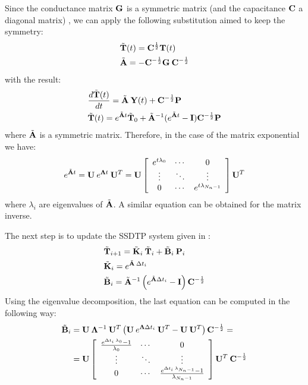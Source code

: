 Since the conductance matrix $\mathbf{\mathbf{G}}$ is a symmetric matrix (and the capacitance $\mathbf{\mathbf{C}}$ a diagonal matrix) \cite{rao2007}, we can apply the following substitution aimed to keep the symmetry:
\begin{align}
  & \tilde{\mathbf{T}}(t) = \mathbf{C}^{\frac{1}{2}} \mathbf{T}(t) \label{eq:substitution} \\
  & \tilde{\mathbf{A}} = -\mathbf{C}^{-\frac{1}{2}} \mathbf{G} \: \mathbf{C}^{-\frac{1}{2}} \nonumber
\end{align}
with the result:
\begin{align*}
  & \frac{d\tilde{\mathbf{T}}(t)}{dt} = \tilde{\mathbf{A}} \: \mathbf{Y}(t) + \mathbf{C}^{-\frac{1}{2}} \mathbf{P} \\
  & \tilde{\mathbf{T}}(t) = e^{\tilde{\mathbf{A}} t} \tilde{\mathbf{T}}_0 + \tilde{\mathbf{A}}^{-1} (e^{\tilde{\mathbf{A}} t} - \mathbf{I}) \mathbf{C}^{-\frac{1}{2}} \mathbf{P}
\end{align*}
where $\tilde{\mathbf{A}}$ is a symmetric matrix. Therefore, in the case of the matrix exponential we have:
\begin{equation} \label{eq:matrix-exponential}
  e^{\tilde{\mathbf{A}} t} = \mathbf{U} \: e^{\mathbf{\Lambda} t} \: \mathbf{U}^T = \mathbf{U} \left[
      \begin{array}{ccc}
        e^{t \lambda_0} & \cdots & 0 \\
        \vdots & \ddots & \vdots \\
        0 & \cdots & e^{t \lambda_{N_n - 1}}
      \end{array}
    \right] \mathbf{U}^T
\end{equation}
where $\lambda_i$ are eigenvalues of $\tilde{\mathbf{A}}$. A similar equation can be obtained for the matrix inverse.

The next step is to update the SSDTP system given in :
\begin{align}
  & \tilde{\mathbf{T}}_{i+1} = \tilde{\mathbf{K}}_i \: \tilde{\mathbf{T}}_i + \tilde{\mathbf{B}}_i \: \mathbf{P}_i \label{eq:recurrent-equation} \\
  & \tilde{\mathbf{K}}_i = e^{\tilde{\mathbf{A}} \: \Delta t_i} \nonumber \\
  & \tilde{\mathbf{B}}_i = \tilde{\mathbf{A}}^{-1} \left( e^{\tilde{\mathbf{A}} \Delta t_i} - \mathbf{I} \right) \mathbf{C}^{-\frac{1}{2}} \nonumber
\end{align}
Using the eigenvalue decomposition, the last equation can be computed in the following way:
\begin{align*}
  \tilde{\mathbf{B}}_i & = \mathbf{U} \: \mathbf{\Lambda}^{-1} \: \mathbf{U}^T \left(\mathbf{U} \: e^{\mathbf{\Lambda} \Delta t_i} \: \mathbf{U}^T - \mathbf{U} \: \mathbf{U}^T \right) \mathbf{C}^{-\frac{1}{2}} = \\
      & = \mathbf{U} \left[
        \begin{array}{ccc}
          \frac{e^{\Delta t_i \: \lambda_0} - 1}{\lambda_0} & \cdots & 0 \\
          \vdots & \ddots & \vdots \\
          0 & \cdots & \frac{e^{\Delta t_i \: \lambda_{N_n - 1}} - 1}{\lambda_{N_n - 1}}
        \end{array}
      \right] \mathbf{U}^T \: \mathbf{C}^{-\frac{1}{2}}
\end{align*}

